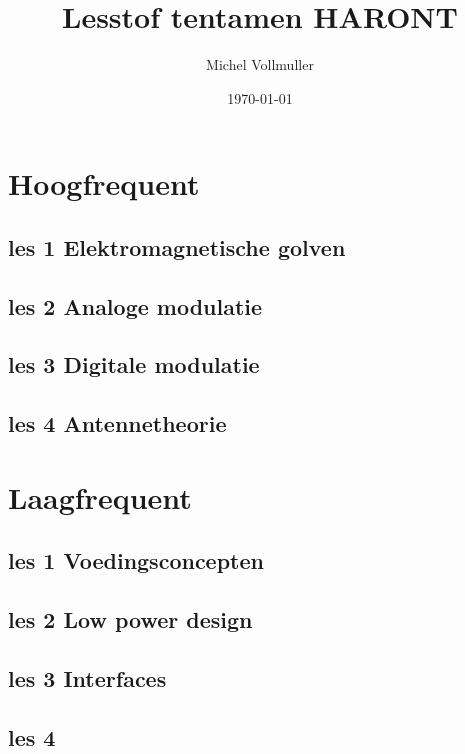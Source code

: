 \documentclass{article}
\begin{document}
\title{Lesstof tentamen HARONT}
\author{Michel Vollmuller}
\date{\today}

\maketitle


\tableofcontents

\newpage

\section{Hoogfrequent}

    \subsection{les 1 Elektromagnetische golven}
    

    \newpage
    \subsection{les 2 Analoge modulatie}
    

    \newpage
    \subsection{les 3 Digitale modulatie}
    

    \subsection{les 4 Antennetheorie}
    

\newpage

\section{Laagfrequent}

    \subsection{les 1 Voedingsconcepten}
    

    \subsection{les 2 Low power design}
    

    \subsection{les 3 Interfaces}
    

    \subsection{les 4}
    

\newpage

\end{document}
